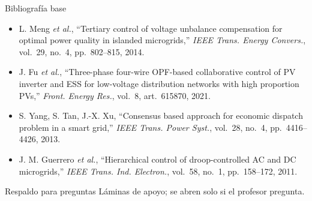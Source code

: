 \documentclass[aspectratio=169,10pt,t]{beamer}
\begin{document}
\begin{frame}{Bibliografía base}
\begin{itemize}
    \item[{[9]}] L. Meng \emph{et al.}, ``Tertiary control of voltage unbalance compensation for optimal power quality in islanded microgrids,'' \emph{IEEE Trans. Energy Convers.}, vol.~29, no.~4, pp.~802--815, 2014.
    \item[{[10]}] J. Fu \emph{et al.}, ``Three-phase four-wire OPF-based collaborative control of PV inverter and ESS for low-voltage distribution networks with high proportion PVs,'' \emph{Front. Energy Res.}, vol.~8, art.~615870, 2021.
    \item[{[11]}] S. Yang, S. Tan, J.-X. Xu, ``Consensus based approach for economic dispatch problem in a smart grid,'' \emph{IEEE Trans. Power Syst.}, vol.~28, no.~4, pp.~4416--4426, 2013.
    \item[{[12]}] J. M. Guerrero \emph{et al.}, ``Hierarchical control of droop-controlled AC and DC microgrids,'' \emph{IEEE Trans. Ind. Electron.}, vol.~58, no.~1, pp.~158--172, 2011.
  \end{itemize}
\end{frame}

\begin{frame}[label=mapa]{Respaldo para preguntas}
  \footnotesize Láminas de apoyo; se abren solo si el profesor pregunta.\\[6pt]
\end{frame}
\end{document}
